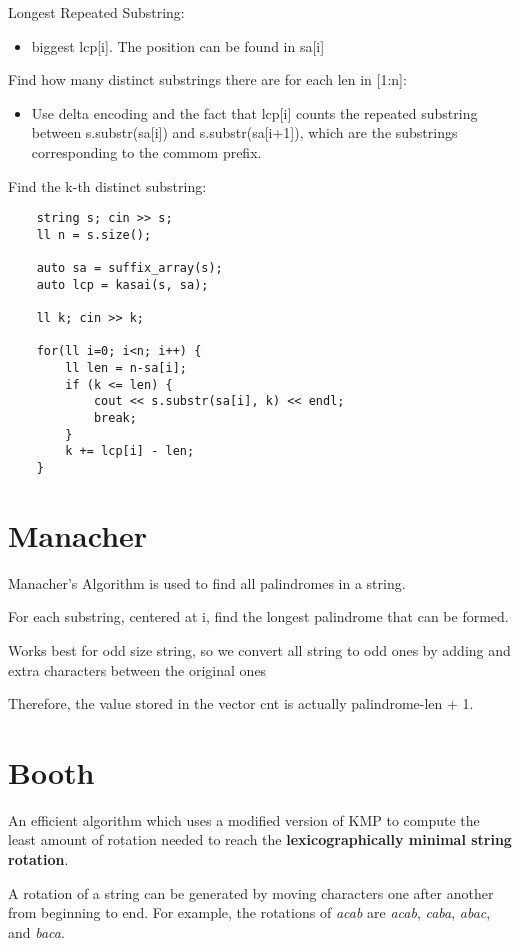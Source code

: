     Longest Repeated Substring:

    \begin{itemize}
    \item biggest lcp[i]. The position can be found in sa[i]
    \end{itemize}

    Find how many distinct substrings there are for each len in [1:n]:

    \begin{itemize}
    \item Use delta encoding and the fact that lcp[i] counts the repeated substring between s.substr(sa[i]) and s.substr(sa[i+1]), which are the substrings corresponding to the commom prefix.
    \end{itemize}
    
    Find the k-th distinct substring: 

    \begin{lstlisting}
    string s; cin >> s;
    ll n = s.size();

    auto sa = suffix_array(s);
    auto lcp = kasai(s, sa);

    ll k; cin >> k;

    for(ll i=0; i<n; i++) {
        ll len = n-sa[i];
        if (k <= len) {
            cout << s.substr(sa[i], k) << endl;
            break;
        }
        k += lcp[i] - len;
    }
    \end{lstlisting}

\section{Manacher}

    Manacher's Algorithm is used to find all palindromes in a string.

    For each substring, centered at i, find the longest palindrome that can be formed.
    
    Works best for odd size string, so we convert all string to odd ones
    by adding and extra characters between the original ones

    Therefore, the value stored in the vector cnt is actually palindrome-len + 1.


\section{Booth}

    An efficient algorithm which uses a modified version of KMP to compute the
    least amount of rotation needed to reach the \textbf{lexicographically minimal string rotation}.

    A rotation of a string can be generated by moving characters one after another from beginning to end.
    For example, the rotations of \textit{acab} are \textit{acab}, \textit{caba}, \textit{abac}, and \textit{baca}.

